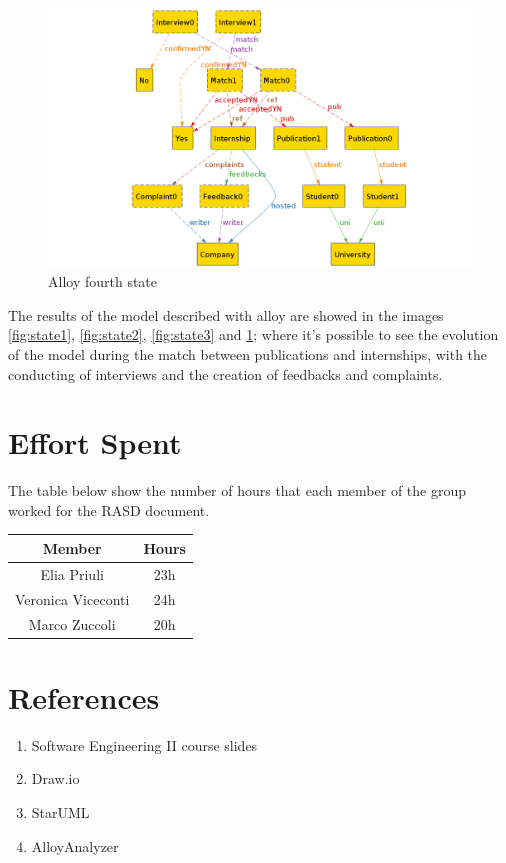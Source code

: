 \documentclass{article}
\begin{document}
\begin{figure}[H]
    \centering
    \includegraphics[width=1\linewidth]{alloy/state4.png}
    \caption{Alloy fourth state}
    \label{fig:state4}
\end{figure}

The results of the model described with alloy are showed in the images \ref{fig:state1}, \ref{fig:state2}, \ref{fig:state3} and \ref{fig:state4}; where it's possible to see the evolution of the model during the match between publications and internships, with the conducting of interviews and the creation of feedbacks and complaints.

\section{Effort Spent}
The table below show the number of hours that each member of the group worked for the RASD document.

\begin{table}[H]
    \begin{tabular}{|c|c|}
    \hline
        \textbf{Member}  & \textbf{Hours}\\ 
    \hline
        Elia Priuli &  23h\\
    \hline
        Veronica Viceconti & 24h \\
    \hline
        Marco Zuccoli & 20h \\
    \hline
    \end{tabular}
    \label{tab:my_label}
\end{table}

\section{References}

\begin{enumerate}
    \item Software Engineering II course slides
    \item Draw.io 
    \item StarUML 
    \item AlloyAnalyzer
\end{enumerate}
\end{document}
